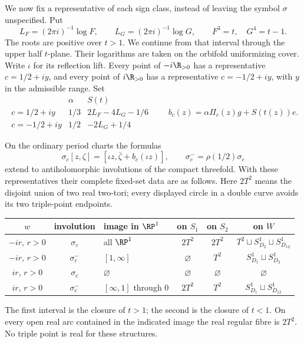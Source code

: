 We now fix a representative of each sign class, instead of leaving the
symbol $\sigma$ unspecified. Put
\[
 L_F=(2\pi i)^{-1}\log F,\qquad L_G=(2\pi i)^{-1}\log G,
 \qquad F^3=t,\quad G^4=t-1.
 \label{mapsI:real-eq-1}
\]
The roots are positive over $t>1$. We continue from that interval
through the upper half $t$-plane. Their logarithms are taken on the
orbifold uniformizing cover. Write $\iota$ for its reflection lift.
Every point of $-i\R_{>0}$ has a representative $c=1/2+iy$, and every
point of $i\R_{>0}$ has a representative $c=-1/2+iy$, with $y$ in the
admissible range. Set
\[
\begin{array}{c|c|c}
 &\alpha&S(t)\\\hline
 c=1/2+iy&1/3&2L_F-4L_G-1/6\\
 c=-1/2+iy&1/2&-2L_G+1/4
\end{array}
\qquad b_c(z)=\alpha\Pi_c(z)g+S(t(z))e.
\label{mapsI:real-eq-2}
\]

\begin{theorem}\label{mapsI:src:A.3.2}
On the ordinary period charts the formulas
\[
 \sigma_c[z,\zeta]=[\iota z,\bar\zeta+b_c(\iota z)],
 \qquad \sigma_c^- =\rho(1/2)\sigma_c
 \label{mapsI:real-eq-3}
\]
extend to antiholomorphic involutions of the compact threefold.
With these representatives their complete fixed-set data are as follows.
Here $2T^2$ means the disjoint union of two real two-tori; every displayed
circle in a double curve avoids its two triple-point endpoints.
\begin{center}\small
\begin{tabular}{cclccc}
\toprule
$w$&involution&image in $\RP^1$&on $S_1$&on $S_2$&on $W$\\
\midrule
$-ir$, $r>0$&$\sigma_c$&all $\RP^1$&$2T^2$&$2T^2$&$T^2\sqcup S^1_{D_2}\sqcup S^1_{D_{12}}$\\
$-ir$, $r>0$&$\sigma_c^-$&$[1,\infty]$&$\varnothing$&$T^2$&$S^1_{D_1}\sqcup S^1_{D_2}$\\
$ir$, $r>0$&$\sigma_c$&$\varnothing$&$\varnothing$&$\varnothing$&$\varnothing$\\
$ir$, $r>0$&$\sigma_c^-$&$[\infty,1]$ through $0$&$2T^2$&$T^2$&$S^1_{D_1}\sqcup S^1_{D_{12}}$\\
\bottomrule
\end{tabular}
\end{center}
The first interval is the closure of $t>1$; the second is the closure
of $t<1$. On every open real arc contained in the indicated image the
real regular fibre is $2T^2$. No triple point is real for these structures.
\end{theorem}


